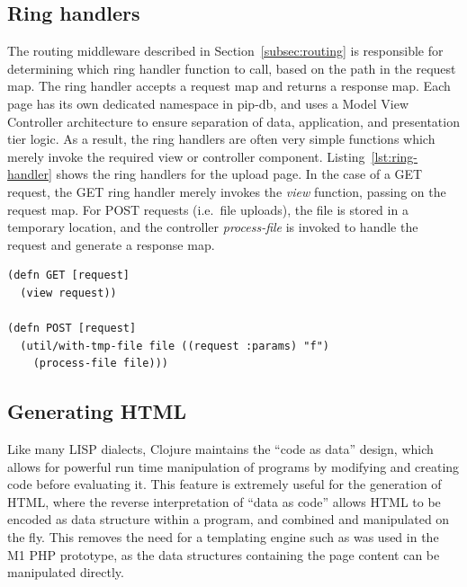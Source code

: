 \subsection{Ring handlers}\label{subsec:ring-handler}

The routing middleware described in Section~\ref{subsec:routing} is
responsible for determining which ring handler function to call, based
on the path in the request map. The ring handler accepts a request map
and returns a response map. Each page has its own dedicated namespace
in pip-db, and uses a Model View Controller architecture to ensure
separation of data, application, and presentation tier logic. As a
result, the ring handlers are often very simple functions which merely
invoke the required view or controller
component. Listing~\ref{lst:ring-handler} shows the ring handlers for
the upload page. In the case of a GET request, the GET ring handler
merely invokes the \textit{view} function, passing on the request
map. For POST requests (i.e.\ file uploads), the file is stored in a
temporary location, and the controller \textit{process-file} is
invoked to handle the request and generate a response map.\\

\lstset{language=clojure}
\begin{lstlisting}[label=lst:ring-handler,caption={%
      [Upload page ring handlers]
       Upload page ring handlers, taken from \texttt{pages/upload.clj}.}]
(defn GET [request]
  (view request))

(defn POST [request]
  (util/with-tmp-file file ((request :params) "f")
    (process-file file)))
\end{lstlisting}

\subsection{Generating HTML}\label{subsec:generating-html}

Like many LISP dialects, Clojure maintains the ``code as data''
design, which allows for powerful run time manipulation of programs by
modifying and creating code before evaluating it. This feature is
extremely useful for the generation of HTML, where the reverse
interpretation of ``data as code'' allows HTML to be encoded as data
structure within a program, and combined and manipulated on the
fly. This removes the need for a templating engine such as was used in
the M1 PHP prototype, as the data structures containing the page
content can be manipulated directly.


